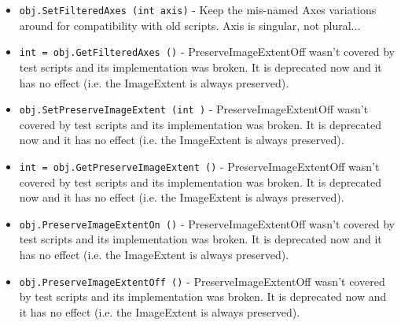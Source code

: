 \begin{itemize}
\item  \verb|obj.SetFilteredAxes (int axis)| -  Keep the mis-named Axes variations around for compatibility with old
 scripts. Axis is singular, not plural...

\item  \verb|int = obj.GetFilteredAxes ()| -  PreserveImageExtentOff wasn't covered by test scripts and its
 implementation was broken.  It is deprecated now and it has
 no effect (i.e. the ImageExtent is always preserved).

\item  \verb|obj.SetPreserveImageExtent (int )| -  PreserveImageExtentOff wasn't covered by test scripts and its
 implementation was broken.  It is deprecated now and it has
 no effect (i.e. the ImageExtent is always preserved).

\item  \verb|int = obj.GetPreserveImageExtent ()| -  PreserveImageExtentOff wasn't covered by test scripts and its
 implementation was broken.  It is deprecated now and it has
 no effect (i.e. the ImageExtent is always preserved).

\item  \verb|obj.PreserveImageExtentOn ()| -  PreserveImageExtentOff wasn't covered by test scripts and its
 implementation was broken.  It is deprecated now and it has
 no effect (i.e. the ImageExtent is always preserved).

\item  \verb|obj.PreserveImageExtentOff ()| -  PreserveImageExtentOff wasn't covered by test scripts and its
 implementation was broken.  It is deprecated now and it has
 no effect (i.e. the ImageExtent is always preserved).

\end{itemize}
